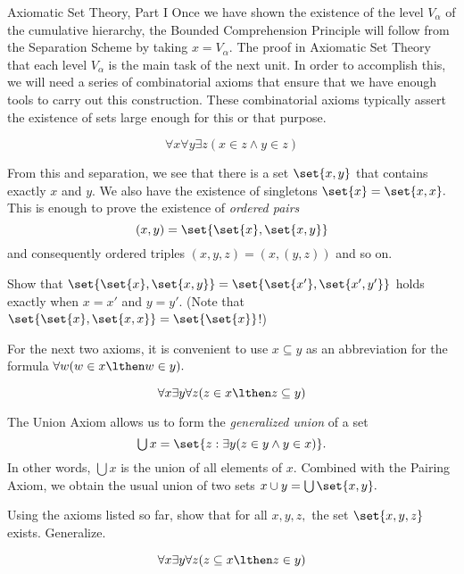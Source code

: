 \begin{unit}{Axiomatic Set Theory, Part I}
Once we have shown the existence of the level \(V_\alpha\) of the cumulative hierarchy, the Bounded Comprehension Principle will follow from the Separation Scheme by taking \(x = V_\alpha.\)
The proof in Axiomatic Set Theory that each level \(V_\alpha\) is the main task of the next unit.
In order to accomplish this, we will need a series of combinatorial axioms that ensure that we have enough tools to carry out this construction.
These combinatorial axioms typically assert the existence of sets large enough for this or that purpose.

\begin{axiom}[Pairing]
  \[\forall x \forall y \exists z (x \in z \land y \in z)\]
\end{axiom}

\noindent
From this and separation, we see that there is a set \(\set{x,y}\) that contains exactly \(x\) and \(y.\)
We also have the existence of singletons \(\set{x} = \set{x,x}.\)
This is enough to prove the existence of \emph{ordered pairs} \[(x,y) = \set{\set{x},\set{x,y}}\] and consequently ordered triples \((x,y,z) = (x,(y,z))\) and so on.

\begin{problem}
  Show that \(\set{\set{x},\set{x,y}} = \set{\set{x'},\set{x',y'}}\) holds exactly when \(x = x'\) and \(y = y'.\)
  (Note that \(\set{\set{x},\set{x,x}} = \set{\set{x}}\)!)
\end{problem}

For the next two axioms, it is convenient to use \(x \subseteq y\) as an abbreviation for the formula \(\forall w(w \in x \lthen w \in y).\)

\begin{axiom}[Union]
  \[\forall x \exists y \forall z (z \in x \lthen z \subseteq y)\]
\end{axiom}

\noindent
The Union Axiom allows us to form the \emph{generalized union} of a set \[{\textstyle \bigcup x} = \set{ z : \exists y(z \in y \land y \in x)}.\]
In other words, \(\bigcup x\) is the union of all elements of \(x.\)
Combined with the Pairing Axiom, we obtain the usual union of two sets \(x \cup y = \bigcup\set{x,y}.\)

\begin{problem}
  Using the axioms listed so far, show that for all \(x,y,z,\) the set \(\set{x,y,z}\) exists. Generalize.
\end{problem}

\begin{axiom}[Powerset]
  \[\forall x \exists y \forall z (z \subseteq x \lthen z \in y)\]
\end{axiom}


\end{unit}
